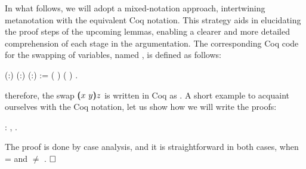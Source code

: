 In what follows, we will adopt a mixed-notation approach, intertwining metanotation with the equivalent Coq notation. This strategy aids in elucidating the proof steps of the upcoming lemmas, enabling a clearer and more detailed comprehension of each stage in the argumentation. The corresponding Coq code for the swapping of variables, named , is defined as follows: 
\begin{coqdoccode}
\coqdocemptyline
\coqdocnoindent
{}  (:) (:) (:) :=  ( \coqdocnotation{==} )     ( \coqdocnotation{==} )    .\coqdoceol
\coqdocemptyline
\end{coqdoccode}
\noindent therefore, the swap $(\!\!(x\ y)\!\!) z$ is written in Coq as    . A short example to acquaint ourselves with the Coq notation, let us show how we will write the proofs:
\begin{coqdoccode}
\coqdocemptyline
\coqdocnoindent
{} : \coqdockw{\ensuremath{\forall}}  ,      .\coqdoceol
\end{coqdoccode}
 The proof is done by case analysis, and it is straightforward in both cases, when  =  and  \ensuremath{\not=} . $\hfill\Box$ 
\begin{coqdoccode}
\coqdocemptyline
\end{coqdoccode}
